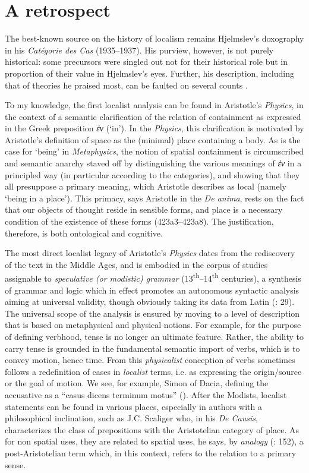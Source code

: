 \documentclass[output=paper]{langscibook}
\begin{document}
\section{A retrospect}
The best-known source on the history of localism remains Hjelmslev’s doxography in his \textit{Catégorie des Cas} (1935--1937). His purview, however, is not purely historical: some precursors were singled out not for their historical role but in proportion of their value in Hjelmslev’s eyes. Further, his description, including that of theories he praised most, can be faulted on several counts \citep{Fortis2018}. 

To my knowledge, the first localist analysis can be found in Aristotle’s \textit{Physics}, in the context of a semantic clarification of the relation of containment as expressed in the Greek preposition \textit{ἐν} (‘in’). In the \textit{Physics}, this clarification is motivated by Aristotle’s definition of space as the (minimal) place containing a body. As is the case for ‘being’ in \textit{Metaphysics}, the notion of spatial containment is circumscribed and semantic anarchy staved off by distinguishing the various meanings of \textit{ἐν} in a principled way (in particular according to the categories), and showing that they all presuppose a primary meaning, which Aristotle describes as local (namely ‘being in a place’). This primacy, says Aristotle in the \textit{De anima}, rests on the fact that our objects of thought reside in sensible forms, and place is a necessary condition of the existence of these forms (423a3--423a8). The justification, therefore, is both ontological and cognitive.

The most direct localist legacy of Aristotle’s \textit{Physics} dates from the rediscovery of the text in the Middle Ages, and is embodied in the corpus of studies assignable to \textit{speculative (or modistic) grammar} (13\textsuperscript{th}--14\textsuperscript{th} centuries), a synthesis of grammar and logic which in effect promotes an autonomous syntactic analysis aiming at universal validity, though obviously taking its data from Latin (\citealt{bursill-hall_speculative_1971}: 29). The universal scope of the analysis is ensured by moving to a level of description that is based on metaphysical and physical notions. For example, for the purpose of defining verbhood, tense is no longer an ultimate feature. Rather, the ability to carry tense is grounded in the fundamental semantic import of verbs, which is to convey motion, hence time. From this \textit{physicalist} conception of verbs sometimes follows a redefinition of cases in \textit{localist} terms, i.e. as expressing the origin\slash source or the goal of motion. We see, for example, Simon of Dacia, defining the accusative as a “casus dicens terminum motus” (\citealt{joly_physique_1977}). After the Modists, localist statements can be found in various places, especially in authors with a philosophical inclination, such as J.C. Scaliger who, in his \textit{De Causis}, characterizes the class of prepositions with the Aristotelian category of place. As for non spatial uses, they are related to spatial uses, he says, by \textit{analogy} (\citeyear{scaliger_causis_2018}: 152), a post-Aristotelian term which, in this context, refers to the relation to a primary sense.
\end{document}
